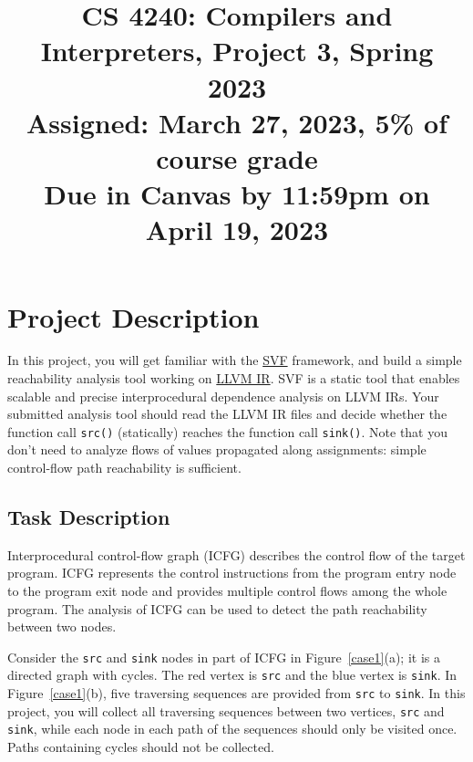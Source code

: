 \documentclass[12pt]{article}
\title{CS 4240: Compilers and Interpreters, Project 3, Spring 2023\\
\Large
Assigned: March 27, 2023, 5\% of course grade\\
{Due in Canvas by 11:59pm on April 19, 2023}\\
}
\author{}
\date{}
\newcommand{\codeIn}[1]{{\small\tt{#1}}}
\begin{document}
\maketitle
\thispagestyle{fancy}


\section{Project Description}

In this project, you will get familiar with the \href{https://github.com/SVF-tools/SVF/wiki}{SVF} framework, and build a simple reachability analysis tool working on \href{https://llvm.org/docs/LangRef.html#instruction-reference}{LLVM IR}. SVF is a static tool that enables scalable and precise interprocedural dependence analysis on LLVM IRs. Your submitted analysis tool should read the LLVM IR files and decide whether the function call \codeIn{src()} (statically) reaches the function call \codeIn{sink()}. Note that you don't need to analyze flows of values propagated along assignments: simple control-flow path reachability is sufficient.



\subsection{Task Description}
Interprocedural control-flow graph (ICFG)  describes the control flow of the target program. ICFG represents the control instructions from the program entry node to the program exit node and provides multiple control flows among the whole program. The analysis of ICFG can be used to detect the path reachability between two nodes. 

Consider the \codeIn{src} and \codeIn{sink} nodes in part of ICFG in Figure~\ref{case1}(a); it is a directed graph with cycles. The red vertex is \codeIn{src} and the blue vertex is \codeIn{sink}. In Figure~\ref{case1}(b), five traversing sequences are provided from \codeIn{src} to \codeIn{sink}. In this project, you will collect all traversing sequences  between two vertices, \codeIn{src} and \codeIn{sink}, while each node in each path of the sequences should only be visited once. Paths containing cycles should
not be collected.
\end{document}
